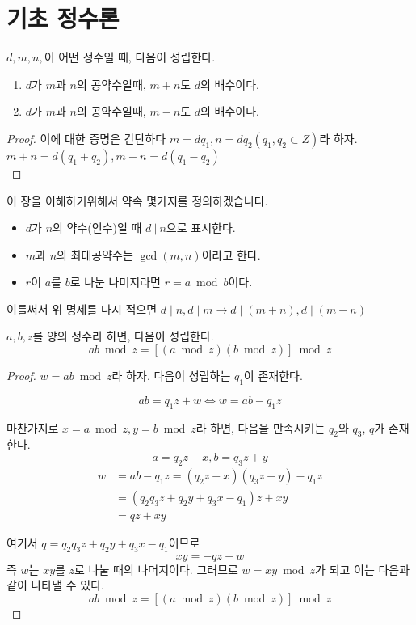 \section{기초 정수론}

\begin{justbox}
    \begin{theorem}
        $d,m,n,$이 어떤 정수일 때, 다음이 성립한다.
        \begin{enumerate}
            \item $d$가 $m$과 $n$의 공약수일때, $m+n$도 $d$의 배수이다.
            \item $d$가 $m$과 $n$의 공약수일때, $m-n$도 $d$의 배수이다.     
        \end{enumerate}
    \end{theorem}
\end{justbox}
\begin{proof}
    이에 대한 증명은 간단하다
    $m=dq_1 , n = dq_2( q_1,q_2 \subset Z)$라 하자.
$m+n = d(q_1 + q_2) , m-n=d(q_1-q_2)$ \\
\end{proof}

이 장을 이해하기위해서 약속 몇가지를 정의하겠습니다.
\begin{itemize}
    \item $d$가 $n$의 약수(인수)일 때 $d\: |\: n$으로 표시한다.
    \item $m$과 $n$의 최대공약수는 $\gcd(m,n)$이라고 한다.
    \item $r$이 $a$를 $b$로 나눈 나머지라면  $r=a\bmod b$이다.
\end{itemize}
이를써서 위 명제를 다시 적으면 $d\mid n , d\mid m  \longrightarrow d \mid (m+n), d\mid (m-n)$        


\begin{justbox}
    \begin{theorem}
        $a,b,z$를 양의 정수라 하면, 다음이 성립한다.
        \[ ab\bmod z= [(a\bmod z)(b \bmod z)]\bmod z \]
    \end{theorem}
\end{justbox}

\begin{proof}

    $w = ab\bmod z$라 하자.
다음이 성립하는 $q_1$이 존재한다.

\[ab=q_1z+w \Longleftrightarrow w=ab-q_1 z \]

마찬가지로 $x =a \bmod z, y=b\bmod z$라 하면, 다음을 만족시키는 $q_2$와 $q_3$, $q$가 존재한다.
$$a=q_2 z + x , b=q_3 z + y$$
\begin{align*}
    w & = ab-q_1 z = (q_2z+x)(q_3z+y)-q_1z\\
    & =(q_2q_3z+q_2y+q_3x-q_1)z+xy\\
    & =qz+xy
\end{align*}
    

여기서 $q=q_2q_3z+q_2y+q_3x-q_1$이므로 
    \[xy=-qz+w\]
즉 $w$는 $xy$를 $z$로 나눌 때의 나머지이다. 그러므로 $w=xy \bmod z$가 되고 이는 다음과 같이 나타낼 수 있다.
     \[ab\bmod z= [(a\bmod z)(b \bmod z)]\bmod z\]    
\end{proof}

